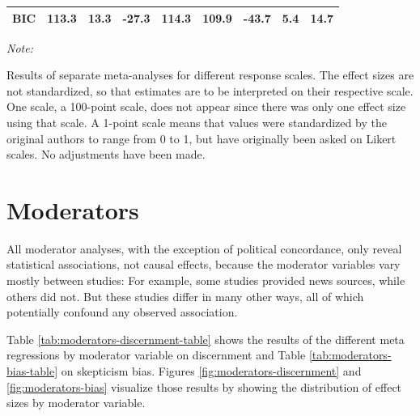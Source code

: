 \documentclass[
  doc,floatsintext]{apa6}
\begin{document}
\begin{table}
{\begin{threeparttable}
\begin{tabular}[t]{lcccccccc}
\hspace{1em}BIC & 113.3 & 13.3 & -27.3 & 114.3 & 109.9 & -43.7 & 5.4 & 14.7\\
\bottomrule
\end{tabular}
\begin{tablenotes}
\item \textit{Note: } 
\item Results of separate meta-analyses for different response scales. The effect sizes are not standardized, so that estimates are to be interpreted on their respective scale. One scale, a 100-point scale, does not appear since there was only one effect size using that scale. A 1-point scale means that values were standardized by the original authors to range from 0 to 1, but have originally been asked on Likert scales. No adjustments have been made.
\end{tablenotes}
\end{threeparttable}}
\end{table}

\clearpage

\section{Moderators}\label{moderators}

\FloatBarrier

All moderator analyses, with the exception of political concordance, only reveal statistical associations, not causal effects, because the moderator variables vary mostly between studies: For example, some studies provided news sources, while others did not. But these studies differ in many other ways, all of which potentially confound any observed association.

Table \ref{tab:moderators-discernment-table} shows the results of the different meta regressions by moderator variable on discernment and Table \ref{tab:moderators-bias-table} on skepticism bias. Figures \ref{fig:moderators-discernment} and \ref{fig:moderators-bias} visualize those results by showing the distribution of effect sizes by moderator variable.
\end{document}
